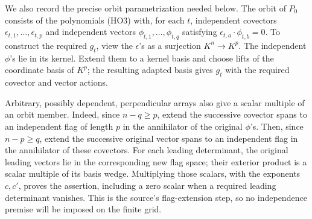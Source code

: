 We also record the precise orbit parametrization needed below.
The orbit of \(P_0\) consists of the polynomials (HO3)
with, for each \(t\), independent covectors
\(\epsilon_{t,1},\ldots,\epsilon_{t,p}\) and independent
vectors \(\phi_{t,1},\ldots,\phi_{t,q}\) satisfying
\(\epsilon_{t,a}\cdot\phi_{t,b}=0\).
To construct the required \(g_t\), view the
\(\epsilon\)'s as a surjection \(K^n\to K^p\).
The independent \(\phi\)'s lie in its kernel.
Extend them to a kernel basis and choose lifts of the
coordinate basis of \(K^p\); the resulting adapted basis
gives \(g_t\) with the required covector and vector
actions.

Arbitrary, possibly dependent, perpendicular arrays also
give a scalar multiple of an orbit member.
Indeed, since \(n-q\ge p\), extend the successive
covector spans to an independent flag of length \(p\)
in the annihilator of the original \(\phi\)'s.
Then, since \(n-p\ge q\), extend the successive original
vector spans to an independent flag in the annihilator
of these covectors.
For each leading determinant, the original leading
vectors lie in the corresponding new flag space;
their exterior product is a scalar multiple of its
basis wedge.  Multiplying those scalars, with the
exponents \(c,c'\), proves the assertion, including
a zero scalar when a required leading determinant
vanishes.  This is the source's flag-extension step,
so no independence premise will be imposed on the
finite grid.

